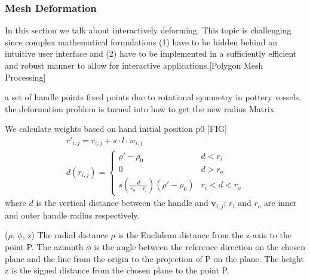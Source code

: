 \subsubsection{Mesh Deformation}
\label{sec:4.2.3}
In this section we talk about interactively deforming. This topic is challenging since complex mathematical formulations (1) have to be hidden behind an intuitive user interface and (2) have to be implemented in a sufficiently efficient and robust manner to allow for interactive applications.[Polygon Mesh Processing] 

a set of handle points
fixed points
due to rotational symmetry in pottery vessels, the deformation problem is turned into how to get the new radius Matrix

We calculate weights based on hand initial position p0 [FIG]
\begin{equation}
\begin{split}
r'_{i,j} = r_{i,j} + s \cdot l \cdot w_{i,j} \\
d(r_{i,j}) = \begin{cases}
\rho' - \rho_{0} &  d < r_{i} \\
0 &  d > r_{o} \\
s(\frac{d}{r_{o}-r_{i}}) (\rho' - \rho_{0}) &  r_{i} < d < r_{o}
\end{cases}
\end{split}
\end{equation}
where $d$ is the vertical distance between the handle and $\mathbf{v}_{i,j}$; $r_{i}$ and $r_{o}$ are inner and outer handle radius respectively. 

($\rho$, $\phi$, z) 
The radial distance $\rho$ is the Euclidean distance from the z-axis to the point P.
The azimuth $\phi$ is the angle between the reference direction on the chosen plane and the line from the origin to the projection of P on the plane.
The height z is the signed distance from the chosen plane to the point P.

